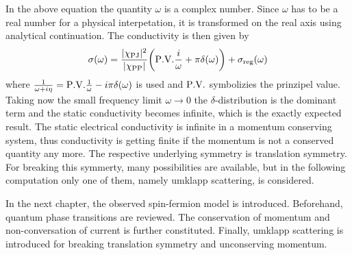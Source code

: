 In the above equation the quantity $\omega$ is a complex number.
Since $\omega$ has to be a real number for a physical interpetation, it is transformed on the real axis using analytical continuation.
The conductivity is then given by
%
\begin{align}
	\sigma(\omega) = \frac{\vert\chi_{\mt{PJ}}\vert^{2}}{\vert\chi_{\mt{PP}}\vert} \bigg(\PV{\frac{i}{\omega}} + \pi \delta(\omega) \bigg) + \sigma_{\mt{reg}}(\omega)
	\label{eq:conductivity unpertubed system}
\end{align}
%
where $\frac{1}{\omega + i\eta} = \PV{\frac{1}{\omega}} - i\pi\delta(\omega)$ is used and $\PV$ symbolizies the prinzipel value.
Taking now the small frequency limit $\omega \to 0$ the $\delta$-distribution is the dominant term and the static conductivity becomes infinite, which is the exactly expected result.
The static electrical conductivity is infinite in a momentum conserving system, thus conductivity is getting finite if the momentum is not a conserved quantity any more.
The respective underlying symmetry is translation symmetry.
For breaking this symmerty, many possibilities are available, but in the following computation only one of them, namely umklapp scattering, is considered.

In the next chapter, the observed spin-fermion model is introduced.
Beforehand, quantum phase transitions are reviewed.
The conservation of momentum and non-conversation of current is further constituted.
Finally, umklapp scattering is introduced for breaking translation symmetry and unconserving momentum.

























